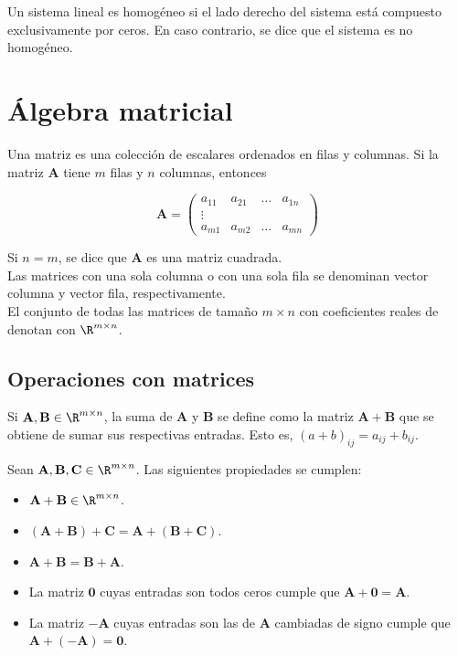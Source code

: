 \begin{defi}
Un sistema lineal es homogéneo si el lado derecho del sistema está compuesto exclusivamente por ceros. En caso contrario, se dice que el sistema es no homogéneo.
\end{defi}

\section{Álgebra matricial}

\begin{defi}
Una matriz es una colección de escalares ordenados en filas y columnas. Si la matriz $\mathbf{A}$ tiene $m$ filas y $n$ columnas, entonces

\[ \mathbf{A} = \left(\begin{array}{cccc}
a_{11} & a_{21} & \dots & a_{1n}\\
\vdots &        &       &       \\
a_{m1} & a_{m2} & \dots & a_{mn} 
\end{array}\right) \]

Si $n = m$, se dice que $\mathbf{A}$ es una matriz cuadrada.\\

Las matrices con una sola columna o con una sola fila se denominan vector columna y vector fila, respectivamente.\\

El conjunto de todas las matrices de tamaño $m \times n$ con coeficientes reales de denotan con $\R^{m\times n}$.
\end{defi}

\subsection*{Operaciones con matrices}

\begin{defi}
Si $\mathbf{A}, \mathbf{B} \in \R^{m \times n}$, la suma de $\mathbf{A}$ y $\mathbf{B}$ se define como la matriz $\mathbf{A} + \mathbf{B}$ que se obtiene de sumar sus respectivas entradas. Esto es, $(a+b)_{ij} = a_{ij} + b_{ij}$.
\end{defi}

\begin{prop}
Sean $\mathbf{A}, \mathbf{B}, \mathbf{C} \in \R^{m\times n}$. Las siguientes propiedades se cumplen:

\begin{itemize}
\item $\mathbf{A} + \mathbf{B} \in \R^{m \times n}$.
\item $(\mathbf{A} + \mathbf{B}) + \mathbf{C} = \mathbf{A} + (\mathbf{B} + \mathbf{C})$.
\item $\mathbf{A} + \mathbf{B} = \mathbf{B} + \mathbf{A}$.
\item La matriz $\mathbf{0}$ cuyas entradas son todos ceros cumple que $\mathbf{A} + \mathbf{0} = \mathbf{A}$.
\item La matriz $-\mathbf{A}$ cuyas entradas son las de $\mathbf{A}$ cambiadas de signo cumple que $\mathbf{A} + (-\mathbf{A}) = \mathbf{0}$.
\end{itemize}
\end{prop}

